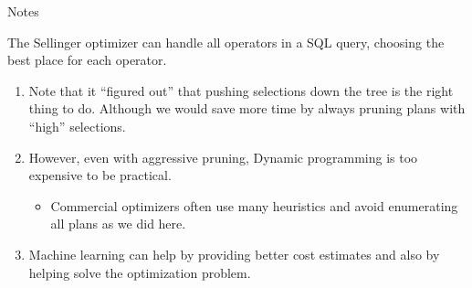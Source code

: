 %
%
\begin{frame}{Notes}

The Sellinger optimizer can handle all operators in a SQL query, choosing the best place for each operator.

\begin{enumerate}[(1)]
\item Note that it ``figured out'' that pushing selections down the tree is the right thing to do. Although we would save more time by always pruning plans with ``high'' selections.

\item However, even with aggressive pruning, Dynamic programming is too expensive to be practical.
\begin{itemize}[-,noitemsep,topsep=-5pt]

\item Commercial optimizers often use many heuristics and avoid enumerating all plans as we did here. 
\end{itemize}

\item Machine learning can help by providing better cost estimates and also by helping solve the optimization problem.

\end{enumerate}
\end{frame}

